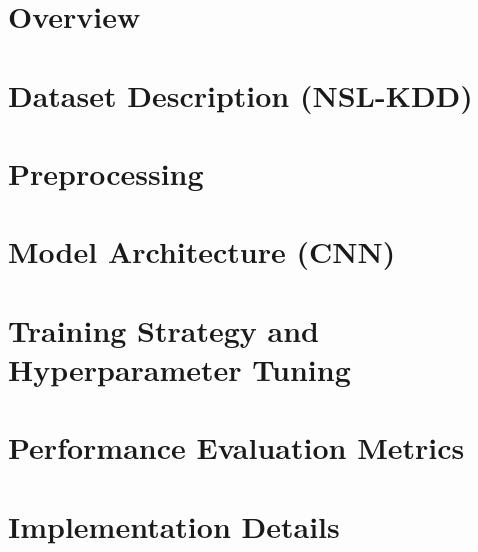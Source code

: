\section{Overview}


\section{Dataset Description (NSL-KDD)}


\section{Preprocessing}


\section{Model Architecture (CNN)}


\section{Training Strategy and Hyperparameter Tuning}


\section{Performance Evaluation Metrics}


\section{Implementation Details}




